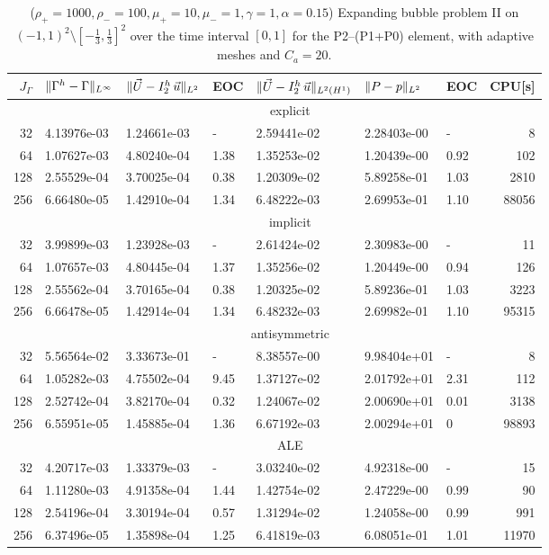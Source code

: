 \begin{table}
\center
\hspace*{-3.25cm}
\begin{tabular}{rllllllr}
\hline
$J_\Gamma$ & $\|\Gamma^h - \Gamma\|_{L^\infty}$ & $\|\vec U - I^h_{2}\,\vec u\|_{L^2}$ & EOC & $\|\vec U - I^h_{2}\,\vec u\|_{L^2(H^1)}$ & $\|P - p\|_{L^2}$ & EOC
& CPU[s] \\
\hline
& \multicolumn{7}{c}{explicit} \\
\hline
 32 & 4.13976e-03 & 1.24661e-03 &    - & 2.59441e-02 & 2.28403e-00 &    - &
8 \\
 64 & 1.07627e-03 & 4.80240e-04 & 1.38 & 1.35253e-02 & 1.20439e-00 & 0.92 &
102 \\
128 & 2.55529e-04 & 3.70025e-04 & 0.38 & 1.20309e-02 & 5.89258e-01 & 1.03 &
2810 \\
256 & 6.66480e-05 & 1.42910e-04 & 1.34 & 6.48222e-03 & 2.69953e-01 & 1.10 &
88056 \\
\hline
& \multicolumn{7}{c}{implicit} \\
\hline
 32 & 3.99899e-03 & 1.23928e-03 &    - & 2.61424e-02 & 2.30983e-00 &    - &
11 \\
 64 & 1.07657e-03 & 4.80445e-04 & 1.37 & 1.35256e-02 & 1.20449e-00 & 0.94 &
126 \\
128 & 2.55562e-04 & 3.70165e-04 & 0.38 & 1.20325e-02 & 5.89236e-01 & 1.03 &
3223 \\
256 & 6.66478e-05 & 1.42914e-04 & 1.34 & 6.48232e-03 & 2.69982e-01 & 1.10 &
95315 \\
\hline
& \multicolumn{7}{c}{antisymmetric} \\
\hline
 32 & 5.56564e-02 & 3.33673e-01 &    - & 8.38557e-00 & 9.98404e+01 &    - &
8 \\
 64 & 1.05282e-03 & 4.75502e-04 & 9.45 & 1.37127e-02 & 2.01792e+01 & 2.31 &
112 \\
128 & 2.52742e-04 & 3.82170e-04 & 0.32 & 1.24067e-02 & 2.00690e+01 & 0.01 &
3138 \\
256 & 6.55951e-05 & 1.45885e-04 & 1.36 & 6.67192e-03 & 2.00294e+01 &    0 &
98893 \\
\hline
& \multicolumn{7}{c}{ALE} \\
\hline
 32 & 4.20717e-03 & 1.33379e-03 &    - & 3.03240e-02 & 4.92318e-00 &    - &
15 \\
 64 & 1.11280e-03 & 4.91358e-04 & 1.44 & 1.42754e-02 & 2.47229e-00 & 0.99 &
90 \\
128 & 2.54196e-04 & 3.30194e-04 & 0.57 & 1.31294e-02 & 1.24058e-00 & 0.99 &
991 \\
256 & 6.37496e-05 & 1.35898e-04 & 1.25 & 6.41819e-03 & 6.08051e-01 & 1.01 &
11970 \\
\hline
\end{tabular}
\hspace*{-3.25cm}
\caption[Navier--Stokes expanding bubble II errors P2--(P1+P0)]
{($\rho_+ = 1000,\rho_- = 100,\mu_+ = 10,\mu_- =1,\gamma = 1,\alpha=0.15$)
Expanding bubble problem II on $(-1,1)^2\setminus[-\frac{1}{3},\frac{1}{3}]^2$
over the time interval $[0,1]$ for the P2--(P1+P0) element, with adaptive
meshes and $C_a=20$\textdegree.}
\label{tab:nsexpandingbubbleIIp2p1p0}
\end{table}
